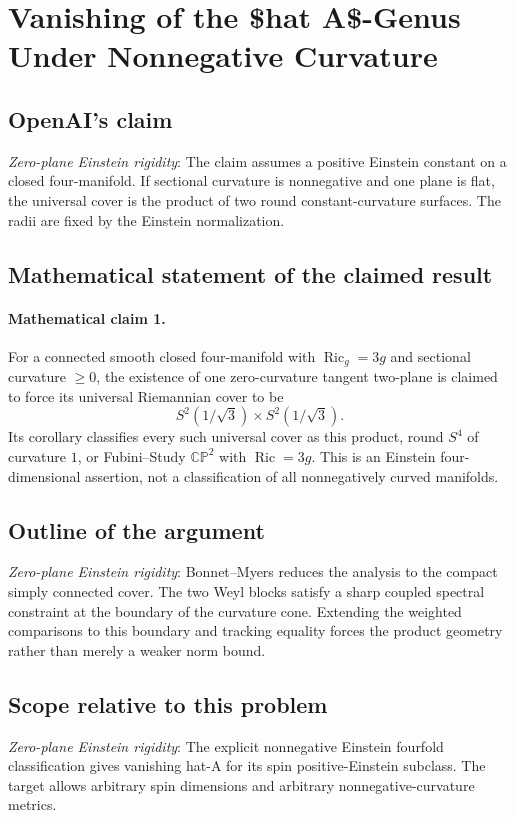 \documentclass[11pt]{article}
\begin{document}
\section*{Vanishing of the \$hat A\$-Genus Under Nonnegative Curvature}

\subsection{OpenAI's claim}
\textit{Zero-plane Einstein rigidity}: The claim assumes a positive Einstein constant on a closed four-manifold. If sectional curvature is nonnegative and one plane is flat, the universal cover is the product of two round constant-curvature surfaces. The radii are fixed by the Einstein normalization.

\subsection{Mathematical statement of the claimed result}
\paragraph{Mathematical claim 1.} For a connected smooth closed four-manifold with $\operatorname{Ric}_g=3g$ and sectional curvature $\ge0$, the existence of one zero-curvature tangent two-plane is claimed to force its universal Riemannian cover to be \[S^2(1/\sqrt3)\times S^2(1/\sqrt3).\] Its corollary classifies every such universal cover as this product, round $S^4$ of curvature $1$, or Fubini--Study $\mathbb{CP}^2$ with $\operatorname{Ric}=3g$. This is an Einstein four-dimensional assertion, not a classification of all nonnegatively curved manifolds.

\subsection{Outline of the argument}
\textit{Zero-plane Einstein rigidity}: Bonnet--Myers reduces the analysis to the compact simply connected cover. The two Weyl blocks satisfy a sharp coupled spectral constraint at the boundary of the curvature cone. Extending the weighted comparisons to this boundary and tracking equality forces the product geometry rather than merely a weaker norm bound.

\subsection{Scope relative to this problem}
\textit{Zero-plane Einstein rigidity}: The explicit nonnegative Einstein fourfold classification gives vanishing hat-A for its spin positive-Einstein subclass. The target allows arbitrary spin dimensions and arbitrary nonnegative-curvature metrics.
\end{document}
